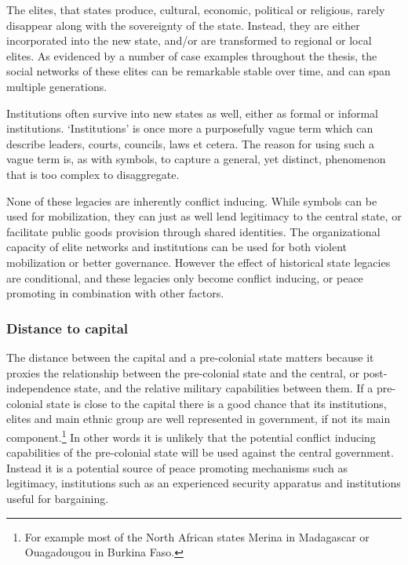 The elites, that states produce, cultural, economic, political or religious,
rarely disappear along with the sovereignty of the state. Instead, they are
either incorporated into the new state, and/or are transformed to regional or
local elites. As evidenced by a number of case examples throughout the thesis,
the social networks of these elites can be remarkable stable over time, and can
span multiple generations.

Institutions often survive into new states as well, either as formal or informal
institutions. `Institutions' is once more a purposefully vague term which can
describe leaders, courts, councils, laws et cetera. The reason for using such a
vague term is, as with symbols, to capture a general, yet distinct, phenomenon
that is too complex to disaggregate.

None of these legacies are inherently conflict inducing. While symbols can be
used for mobilization, they can just as well lend legitimacy to the central
state, or facilitate public goods provision through shared identities. The
organizational capacity of elite networks and institutions can be used for both
violent mobilization or better governance. However the effect of historical
state legacies are conditional, and these legacies only become conflict
inducing, or peace promoting in combination with other factors.

\subsubsection{Distance to capital} \label{dtc}

The distance between the capital and a pre-colonial state matters because it
proxies the relationship between the pre-colonial state and the central, or
post-independence state, and the relative military capabilities between them. If
a pre-colonial state is close to the capital there is a good chance that its
institutions, elites and main ethnic group are well represented in government,
if not its main component.\footnote{For example most of the North African states
Merina in Madagascar or Ouagadougou in Burkina Faso.} In other words it is
unlikely that the potential conflict inducing capabilities of the pre-colonial
state will be used against the central government. Instead it is a potential
source of peace promoting mechanisms such as legitimacy, institutions such as an
experienced security apparatus and institutions useful for bargaining.

